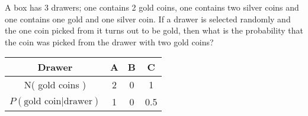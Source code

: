 
%
%
%
%
% 
% 

\question[2] A box has 3 drawers; one contains 2 gold coins, one contains two silver coins
and one contains one gold and one silver coin. If a drawer is selected randomly 
and the one coin picked from it turns out to be gold, then what is the probability
that the coin was picked from the drawer with two gold coins? 


\ifprintanswers
  \begin{table}
    \begin{tabular}{cccc}
       \toprule
       Drawer & A & B & C \\
       \midrule
       N( gold coins ) & 2 & 0 & 1 \\
       $P(\text{gold coin} \vert \text{drawer})$ & 1 & 0 & 0.5 \\
       \bottomrule
    \end{tabular}
  \end{table}
\fi 

